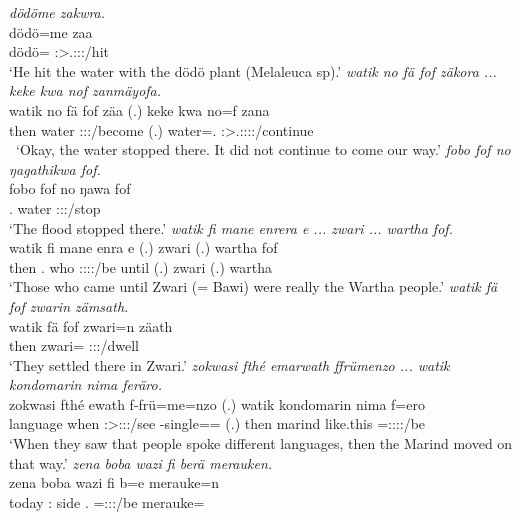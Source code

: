 \begin{exe}
	\emph{dödöme zakwra.}\\
	\gll dödö=me zaa\\ 
	dödö=\Ins{} \Sg:\Sbj>\Tsg.\F:\Obj:\Pst:\Pfv/hit\\
	\trans `He hit the water with the dödö plant (Melaleuca sp).'
	\emph{watik no fä fof zäkora ... keke kwa nof zanmäyofa.}\\
	\gll watik no fä fof zäa (.) keke kwa no=f zana\\ 
	then water \Dist{} \Emph{} \Sg:\Sbj:\Pst:\Ipfv/become (.) \Neg{} \Fut{} water=\Erg.\Sg{} \Sg:\Sbj>\Tsg.\F:\Obj:\Pst:\Pfv:\Venit/continue\\\
	\trans `Okay, the water stopped there. It did not continue to come our way.'
\exi{73} 
	\emph{fobo fof no ŋagathikwa fof.}\\
	\gll fobo fof no ŋawa fof\\ 
	\Dist.\All{} \Emph{} water \Sg:\Sbj:\Pst:\Ipfv/stop \Emph\\
	\trans `The flood stopped there.'
	\emph{watik fi mane enrera e ... zwari ... wartha fof.}\\
	\gll watik fi mane enra e (.) zwari (.) wartha fof\\ 
	then \Third.\Abs{} who \Sg:\Sbj:\Pst:\Ipfv:\Venit/be until (.) zwari (.) wartha \Emph{}\\
	\trans `Those who came until Zwari (= Bawi) were really the Wartha people.'
\exi{75} 
	\emph{watik fä fof zwarin zämsath.}\\
	\gll watik fä fof zwari=n zäath\\ 
	then \Dist{} \Emph{} zwari=\Loc{} \Stpl:\Sbj:\Pst:\Pfv/dwell\\
	\trans `They settled there in Zwari.'
	\emph{zokwasi fthé emarwath ffrümenzo ... watik kondomarin nima feräro.}\\
	\gll zokwasi fthé e\stem{mar}wath f-frü=me=nzo (.) watik kondomarin nima f=ero\\ 
	language when \Stpl:\Sbj>\Stpl:\Obj:\Pst:\Ipfv/see \Redup-single=\Ins=\Only{} (.) then marind like.this \Dist=\Stpl:\Sbj:\Pst:\Ipfv:\Andat/be\\
	\trans `When they saw that people spoke different languages, then the Marind moved on that way.'
\exi{77} 
	\emph{zena boba wazi fi berä merauken.}\\
	\gll zena boba wazi fi b=e merauke=n\\ 
	today \Med:\Abl{} side \Third.\Abs{} \Med=\Stpl:\Sbj:\Nonpast:\Ipfv/be merauke=\Loc\\

\end{exe}
